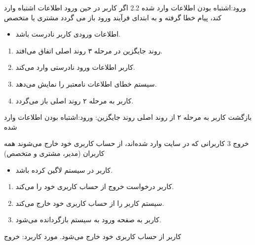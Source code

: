 {\alternativeflow
{
	ورود:اشتباه بودن اطلاعات وارد شده
}
{2.2}
{
	اگر کاربر در حین ورود اطلاعات اشتباه وارد کند، پیام خطا گرفته و به ابتدای فرآیند ورود باز می گردد
}
{
	مشتری یا متخصص
}
{}
{
	\begin{itemize}
		
		\item
		اطلاعات ورودی کاربر نادرست باشد.
	\end{itemize}
}
{
	\vspace*{-0.6cm}
	\begin{enumerate}
		\item 
		روند جایگزین در مرحله ۳ روند اصلی اتفاق می‌افتد.
		\item
		کاربر اطلاعات ورود نادرستی وارد می‌کند.
		\item 
		سیستم خطای اطلاعات نامعتبر را نمایش می‌دهد.
		\item
		کاربر به مرحله ۲ روند اصلی باز می‌گردد.
	\end{enumerate}
}
{
	بازگشت کاربر به مرحله ۲ از روند اصلی
}
{
	روند جایگزین: ورود:اشتباه بودن اطلاعات وارد شده
}
}

{
\usecase
{خروج}
{3}
{کاربرانی که در سایت وارد شده‌اند، از حساب کاربری خود خارج می‌شوند}
{همه کاربران (مدیر، مشتری و متخصص)}
{}
{
	\begin{itemize}
		\item
		کاربر در سیستم لاگین کرده باشد.

	\end{itemize}
	
}
{
	\begin{enumerate}
		\item 
		کاربر درخواست خروج از  حساب کاربری خود را می‌کند.
		
		
		\item 
		سیستم کاربر را از حساب کاربری خود خارج می‌کند.
		
		\item
		کاربر به صفحه ورود به سیستم بازگردانده می‌شود.
		
	
	\end{enumerate}
}{کاربر از حساب کاربری خود خارج می‌شود.}
{	
}
{مورد کاربرد: خروج }
}

